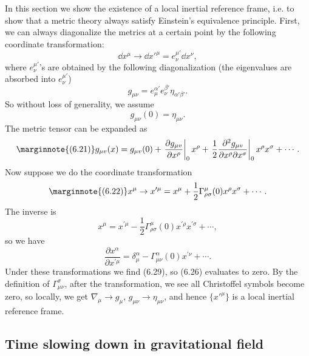 \documentclass[hyperref, a4paper]{article}
\begin{document}
In this section we show the existence of a local inertial reference frame, i.e. to show that a metric theory 
always satisfy Einstein's equivalence principle. First, we can always diagonalize the metrics at a certain point
by the following coordinate transformation:
\begin{equation}
    \dd{x^\mu} \to \dd{x'^\mu} = e^{\mu'}_\nu \dd{x^\nu},
\end{equation}
where $e^{\mu'}_\nu$'s are obtained by the following diagonalization 
(the eigenvalues are absorbed into $e^{\mu'}_\nu$)
\begin{equation}
    g_{\mu \nu} = e^{\alpha'}_\mu e^{\beta'}_\nu \eta_{\alpha' \beta'}.
\end{equation}
So without loss of generality, we assume 
\begin{equation}
    g_{\mu \nu}(0) = \eta_{\mu \nu}.
\end{equation}
The metric tensor can be expanded as 
\begin{equation} \marginnote{(6.21)}
    g_{\mu v}(x)=g_{\mu v}(0)+\left.\frac{\partial g_{\mu v}}{\partial x^{\rho}}\right|_{0} x^{\rho}+\left.\frac{1}{2} \frac{\partial^{2} g_{\mu v}}{\partial x^{\rho} \partial x^{\sigma}}\right|_{0} x^{\rho} x^{\sigma}+\cdots.
\end{equation}
Now suppose we do the coordinate transformation 
\begin{equation} \marginnote{(6.22)}
    x^{\mu} \rightarrow x^{\prime \mu}=x^{\mu}+\frac{1}{2} \Gamma_{\rho \sigma}^{\mu}(0) x^{\rho} x^{\sigma} + \cdots.
\end{equation}
The inverse is 
\begin{equation}
    x^{\mu}=x^{\prime \mu}-\frac{1}{2} \Gamma_{\rho \sigma}^{\mu}(0) x^{\prime \rho} x^{\prime \sigma}+\cdots,
\end{equation}
so we have 
\begin{equation}
    \frac{\partial x^{\alpha}}{\partial x^{\prime \mu}}=\delta_{\mu}^{\alpha}-\Gamma_{\mu \nu}^{\alpha}(0) x^{\prime \nu}+\cdots.
\end{equation}
Under these transformations we find (6.29), so (6.26) evaluates to zero. 
By the definition of $\Gamma^\sigma_{\mu \nu}$, after the transformation, we see all Christoffel symbols become zero, so locally, we get $\nabla_\mu \to g_\mu$, $g_{\mu \nu} \to \eta_{\mu \nu}$, and hence $\{x'^\mu\}$
is a local inertial reference frame.

\subsection{Time slowing down in gravitational field}
\end{document}
